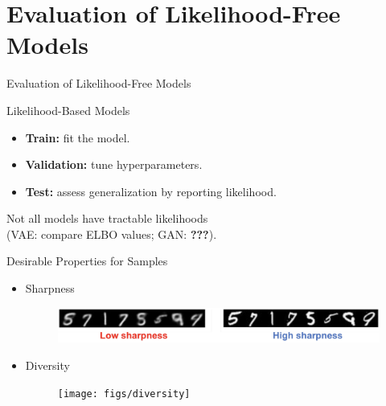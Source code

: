 \documentclass{beamer}
\begin{document}
\section{Evaluation of Likelihood-Free Models}
\begin{frame}{Evaluation of Likelihood-Free Models}
	\begin{block}{Likelihood-Based Models}
		\begin{itemize}
			\item \textbf{Train:} fit the model.
			\item \textbf{Validation:} tune hyperparameters.
			\item \textbf{Test:} assess generalization by reporting likelihood.
		\end{itemize}
	\end{block}
	\eqpause
	Not all models have tractable likelihoods \\ (VAE: compare ELBO values; GAN: \textbf{???}).
	\eqpause
	\begin{block}{Desirable Properties for Samples}
		\begin{itemize}
			\item Sharpness
			\begin{figure}
				\centering
				\includegraphics[width=0.9\linewidth]{figs/sharpness}
			\end{figure}
			\eqpause
			\item Diversity
			\begin{figure}
				\centering
				\texttt{[image: figs/diversity]}
			\end{figure}
		\end{itemize}
	\end{block}
\end{frame}
\end{document}
